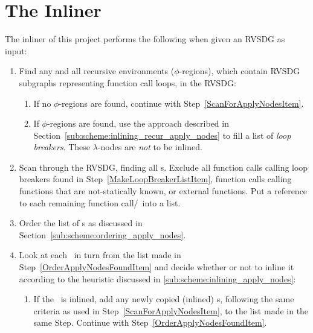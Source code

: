 
\clearpage
\section{The Inliner}
\label{scheme:start}


The inliner of this project performs the following when given an RVSDG as input:

\begin{enumerate}

	\item Find any and all recursive environments ($\phi$-regions), which
contain RVSDG subgraphs representing function call loops, in the RVSDG:

	\begin{enumerate}
		\item If no $\phi$-regions are found, continue with
Step~\ref{ScanForApplyNodesItem}.

		\item If $\phi$-regions are found, use the approach described
in Section~\ref{sub:scheme:inlining_recur_apply_nodes} to fill a list of
\textit{loop breakers}. These $\lambda$-nodes are \textit{not} to be inlined.
		\label{MakeLoopBreakerListItem}
	\end{enumerate}

	\item Scan through the RVSDG, finding all \applyNode s. Exclude all function
calls calling loop breakers found in Step~\ref{MakeLoopBreakerListItem},
function calls calling functions that are not-statically known, or external
functions. Put a reference to each remaining function call/\applyNode~into a
list.
	\label{ScanForApplyNodesItem}

	\item Order the list of \applyNode s as discussed in
Section~\ref{sub:scheme:ordering_apply_nodes}.
	\label{OrderApplyNodesFoundItem}

	\item Look at each \applyNode~in turn from the list made in
Step~\ref{OrderApplyNodesFoundItem} and decide whether or not to inline it
according to the heuristic discussed in \ref{sub:scheme:inlining_apply_nodes}:
	\label{LookAtNextCallSiteItem}

	\begin{enumerate}
		\item If the \applyNode~is inlined, add any newly copied (inlined)
\applyNode s, following the same criteria as used in
Step~\ref{ScanForApplyNodesItem}, to the list made in the same Step. Continue
with Step~\ref{OrderApplyNodesFoundItem}.


\end{enumerate}
\end{enumerate}
